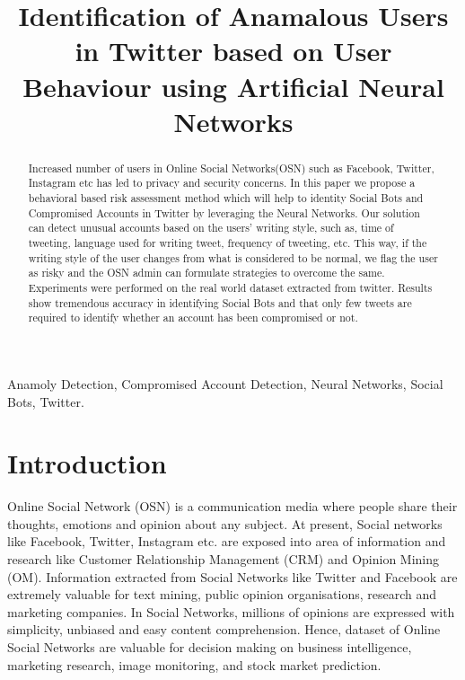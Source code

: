 \documentclass[conference]{IEEEtran}
\begin{document}
\title{Identification of Anamalous Users in Twitter based on User Behaviour using Artificial Neural Networks}

\author{

}

\maketitle

\begin{abstract}

Increased number of users in Online Social Networks(OSN) such as Facebook, Twitter, Instagram etc has led to privacy and security concerns. In this paper we propose a behavioral based risk assessment method which will help to identity Social Bots and Compromised Accounts in Twitter by leveraging the Neural Networks.
Our solution can detect unusual accounts based on the users' writing style, such as, time of tweeting, language used for writing tweet, frequency of tweeting, etc. This way, if the writing style of the user changes 
from what is considered to be normal, we flag the user as risky and the OSN admin can formulate strategies to overcome the same. Experiments were performed 
on the real world dataset extracted from twitter. Results show tremendous accuracy in identifying Social Bots and that only few tweets are required to identify whether an account has been compromised or not.

\end{abstract}

\begin{IEEEkeywords}

Anamoly Detection, Compromised Account Detection, Neural Networks, Social Bots, Twitter.

\end{IEEEkeywords}

\section{Introduction}

Online Social Network (OSN) is a communication media where people share their thoughts, emotions and opinion about any subject. At present, Social networks like Facebook, Twitter, Instagram etc. are exposed
into area of information and research like Customer Relationship Management (CRM) and Opinion Mining (OM). Information extracted from Social Networks like Twitter and Facebook are extremely valuable for text mining, public opinion organisations, research and marketing companies.
In Social Networks, millions of opinions are expressed with simplicity, unbiased and easy content comprehension. Hence, dataset of Online Social Networks are valuable for decision making on 
business intelligence, marketing research,  image monitoring, and stock market prediction.
\end{document}
